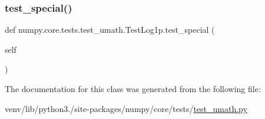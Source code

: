 \subsubsection{\texorpdfstring{test\+\_\+special()}{test\_special()}}
{\footnotesize\ttfamily def numpy.\+core.\+tests.\+test\+\_\+umath.\+Test\+Log1p.\+test\+\_\+special (\begin{DoxyParamCaption}\item[{}]{self }\end{DoxyParamCaption})}



The documentation for this class was generated from the following file\+:\begin{DoxyCompactItemize}
\item 
venv/lib/python3./site-\/packages/numpy/core/tests/\hyperlink{test__umath_8py}{test\+\_\+umath.\+py}\end{DoxyCompactItemize}
